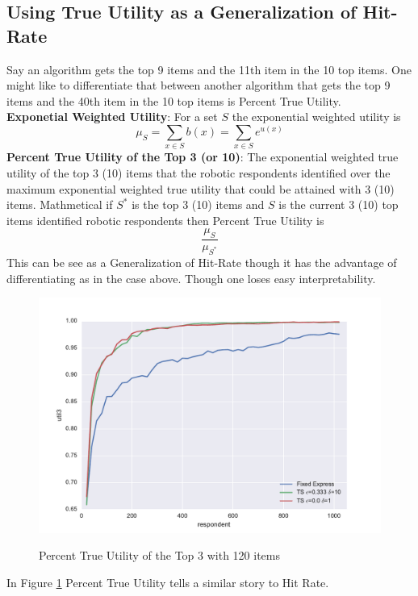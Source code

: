 \documentclass[mksc,blindrev]{informs3} %
\begin{document}
\subsection{Using True Utility as a Generalization of Hit-Rate}
Say an algorithm gets the top 9 items and the 11th item in the 10 top items. One might like to differentiate that between another algorithm that gets the top 9 items and the 40th item in the 10 top items is Percent True Utility. \\
\textbf{Exponetial Weighted Utility}: For a set $S$ the exponential weighted utility is \[\mu_S=\sum_{x \in S}b(x)=\sum_{x \in S}e^{u(x)}\]
\textbf{Percent True Utility of the Top 3 (or 10)}: The exponential weighted true utility of the top 3 (10) items that the robotic respondents identified over the maximum exponential weighted true utility that could be attained with 3 (10) items. Mathmetical if $S^*$ is the top 3 (10) items and $S$ is the current 3 (10) top items identified robotic respondents then Percent True Utility is 
\[
\frac{\mu_S}{\mu_{S^*}}
\]
This can be see as a Generalization of Hit-Rate though it has the advantage of differentiating as in the case above. Though one loses easy interpretability. 
\begin{figure}
\caption{Percent True Utility of the Top 3 with 120 items}
\includegraphics[width=1\textwidth]{plots/3util120show3.pdf}
\label{fig:3util}
\end{figure}
In Figure \ref{fig:3util} Percent True Utility tells a similar story to Hit Rate.
\end{document}

